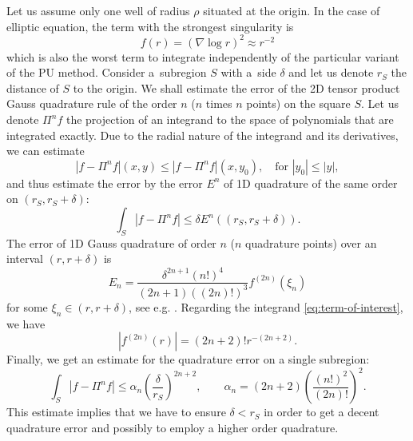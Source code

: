 \documentclass{elsarticle}
\def\vc#1{\mathbf{\boldsymbol{#1}}}     %
\def\abs#1{\left|#1\right|}
\def\d{\mathrm{d}}
\def\abs#1{| #1 |}
\newcommand{\noteJB}[1]{{\color{Blue} \textbf{JB: } \textit{#1}}}
\begin{document}
Let us assume only one well of radius $\rho$ situated at the origin. In the case of elliptic equation, the term with the strongest singularity is 
\begin{equation}
    \label{eq:term-of-interest}
    f(r)=(\nabla \log r )^2 \approx r^{-2}
\end{equation}
which is also the worst term to integrate independently of the particular variant of the PU method.
Consider a~subregion $S$ with a~side $\delta$ and 
let us denote $r_{S}$ the distance of $S$ to the origin.
We shall estimate the error of the 2D tensor product Gauss quadrature rule of the order $n$ ($n$ times $n$ points) on the square $S$. Let us denote 
$\Pi^n f$ the projection of an integrand to the space of polynomials that are integrated exactly. Due to the radial nature of the integrand and its derivatives,
we can estimate
\[
  \abs{f-\Pi^n f}(x,y) \le \abs{f-\Pi^n f}(x,y_0), \quad \text{for } \abs{y_0} \le \abs{y},
\]
and thus estimate the error by the error $E^n$ of 
 1D quadrature of the same order on $(r_{S}, r_{S}+\delta)$:
\[
  \int_S \abs{f-\Pi^n f} \le \delta E^n((r_{S}, r_{S}+\delta)).
\]
The error of 1D Gauss quadrature of order $n$ ($n$ quadrature points) over an interval $(r,r+\delta)$ is 
\[
  E_n = \frac{\delta^{2n+1} (n!)^4}{(2n+1)((2n)!)^3} f^{(2n)}(\xi_n) 
\]
for some $\xi_n \in (r, r+\delta)$, see e.g. \cite{kahaner_numerical_1989}. 
Regarding the integrand \eqref{eq:term-of-interest}, we have 
\[
  \abs{f^{(2n)}(r)} = (2n+2)! r^{-(2n+2)}.
\]
Finally, we get an estimate for the quadrature error on a single subregion:
\[
    \int_S \abs{f-\Pi^n f} \le  \alpha_n \left( \frac{\delta}{r_{S}} \right)^{2n+2}, 
  \qquad \alpha_n = (2n+2)\left( \frac{(n!)^2}{(2n)!} \right)^2.
\]
This estimate implies that we have to ensure $\delta < r_S$ in order to get a decent quadrature error 
and possibly to employ a higher order quadrature. 


\end{document}
